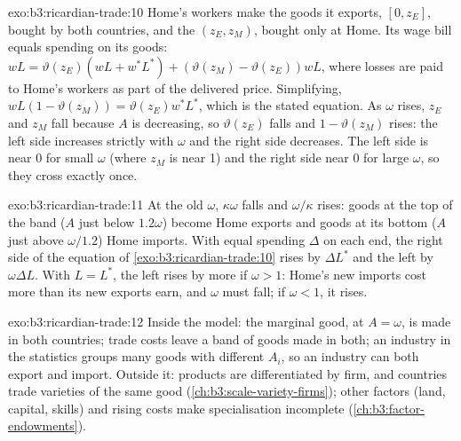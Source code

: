 \begin{solution}{exo:b3:ricardian-trade:10}
Home's workers make the goods it exports, $[0, z_E]$, bought by both countries,
and the  $(z_E, z_M)$, bought only at Home. Its wage bill equals
spending on its goods:
$wL = \vartheta(z_E)(wL + w^*L^*) + (\vartheta(z_M) - \vartheta(z_E))wL$, where 
losses are paid to Home's workers as part of the delivered price. Simplifying,
$wL(1 - \vartheta(z_M)) = \vartheta(z_E)w^*L^*$, which is the stated equation. As $\omega$
rises, $z_E$ and $z_M$ fall because $A$ is decreasing, so $\vartheta(z_E)$ falls and $1 -
\vartheta(z_M)$ rises: the left side increases strictly with $\omega$ and the right side
decreases. The left side is near 0 for small $\omega$ (where $z_M$ is near 1) and the
right side near 0 for large $\omega$, so they cross exactly once.
\end{solution}

\begin{solution}{exo:b3:ricardian-trade:11}
At the old $\omega$, $\kappa\omega$ falls and $\omega/\kappa$ rises: goods at the top of the band
($A$ just below $1.2\omega$) become Home exports and goods at its bottom ($A$ just
above $\omega/1.2$) Home imports. With equal spending $\Delta$ on each end, the right
side of the equation of \cref{exo:b3:ricardian-trade:10} rises by $\Delta L^*$ and the
left by $\omega\Delta L$. With $L = L^*$, the left rises by more if $\omega > 1$: Home's new
imports cost more than its new exports earn, and $\omega$ must fall; if $\omega < 1$, it
rises.
\end{solution}

\begin{solution}{exo:b3:ricardian-trade:12}
Inside the model: the marginal good, at $A = \omega$, is made in both countries;
trade costs leave a band of goods made in both; an industry in the statistics
groups many goods with different $A_i$, so an industry can both export and
import. Outside it: products are differentiated by firm, and countries trade
varieties of the same good (\cref{ch:b3:scale-variety-firms}); other factors
(land, capital, skills) and rising costs make specialisation incomplete
(\cref{ch:b3:factor-endowments}).
\end{solution}


